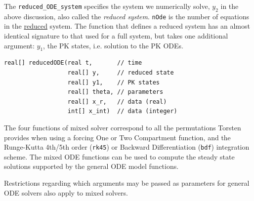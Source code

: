 \documentclass[11pt, reqno, oneside]{amsbook}
\numberwithin{equation}{chapter}
\numberwithin{figure}{chapter}
\numberwithin{table}{chapter}
\theoremstyle{remark}
\begin{document}
The \texttt{reduced\_ODE\_system} specifies the system we
numerically solve, \(y_2\) in the above discussion, also called the
\emph{reduced system}. \texttt{nOde} is the number of equations in
the \underline{reduced} system. The function that defines a reduced
system has an almost identical signature to that used for a full
system, but takes one additional argument: \(y_1\), the PK states,
i.e. solution to the PK ODEs.
\begin{verbatim}
real[] reducedODE(real t,       // time
                  real[] y,     // reduced state
                  real[] y1,    // PK states
                  real[] theta, // parameters
                  real[] x_r,   // data (real)
                  int[] x_int)  // data (integer)
\end{verbatim}

The four functions of mixed solver correspond to all the permutations Torsten
provides when using a forcing One or Two Compartment function, and the
Runge-Kutta 4th/5th order (\texttt{rk45}) or Backward Differentiation (\texttt{bdf})
integration scheme. The mixed ODE functions can be used to compute the
steady state solutions supported by the general ODE model functions.

Restrictions regarding which arguments may be passed as parameters for
general ODE solvers also apply to
mixed solvers.
\end{document}
